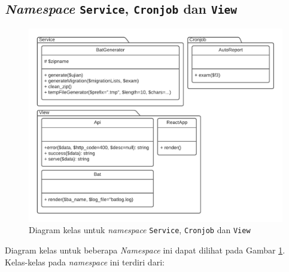 \subsection{\textit{Namespace} \texttt{Service}, \texttt{Cronjob} dan
\texttt{View}}
    \begin{figure}
        \centering
        \includegraphics[width=0.75\paperwidth]{Gambar/classmap-be/Classmap - app-service,cronjob,view.pdf}
        \caption{Diagram kelas untuk \textit{namespace} \texttt{Service},
            \texttt{Cronjob} dan \texttt{View}}
        \label{fig:classmap_app-service,cronjob,view}
    \end{figure}
    Diagram kelas untuk beberapa \textit{Namespace} ini dapat dilihat pada
    Gambar \ref{fig:classmap_app-service,cronjob,view}. Kelas-kelas pada
    \textit{namespace} ini terdiri dari:
